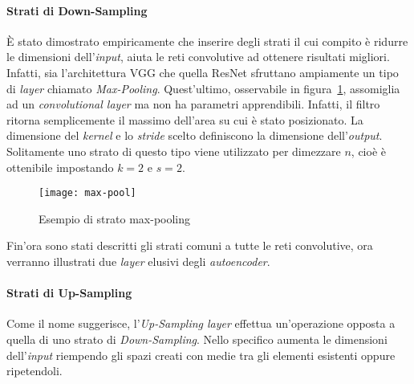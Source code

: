 \paragraph{Strati di Down-Sampling}
È stato dimostrato empiricamente che inserire degli strati il cui compito è ridurre le dimensioni dell'\textit{input}, aiuta le reti convolutive ad ottenere risultati migliori.
Infatti, sia l'architettura VGG che quella ResNet sfruttano ampiamente un tipo di \textit{layer} chiamato \textit{Max-Pooling}.
Quest'ultimo, osservabile in figura~\ref{fig:pool_layer}, assomiglia ad un \textit{convolutional layer} ma non ha parametri apprendibili.
Infatti, il filtro ritorna semplicemente il massimo dell'area su cui è stato posizionato.
La dimensione del \textit{kernel} e lo \textit{stride} scelto definiscono la dimensione dell'\textit{output}.
Solitamente uno strato di questo tipo viene utilizzato per dimezzare $n$, cioè è ottenibile impostando $k=2$ e $s=2$.

\begin{figure}[ht]
\centering
  \texttt{[image: max-pool]}
    \caption{Esempio di strato max-pooling}
    \label{fig:pool_layer}
\end{figure}



Fin'ora sono stati descritti gli strati comuni a tutte le reti convolutive, ora verranno illustrati due \textit{layer} elusivi degli \textit{autoencoder}.

\paragraph{Strati di Up-Sampling}
Come il nome suggerisce, l'\textit{Up-Sampling layer} effettua un'operazione opposta a quella di uno strato di \textit{Down-Sampling}.
Nello specifico aumenta le dimensioni dell'\textit{input} riempendo gli spazi creati con medie tra gli elementi esistenti oppure ripetendoli.

